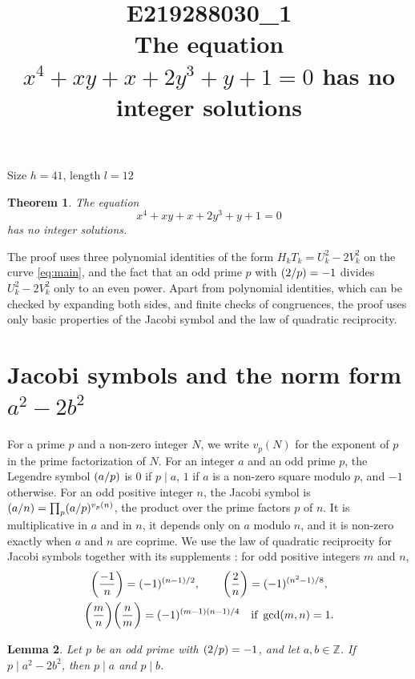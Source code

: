 \documentclass[11pt]{article}
\title{\textbf{E219288030\_1}\\[4pt] {\Large The equation $x^{4}+xy+x+2y^{3}+y+1=0$ has no integer solutions}}
\author{}
\date{}
\newtheorem{theorem}{Theorem}
\newtheorem{lemma}[theorem]{Lemma}
\newcommand{\Z}{\mathbb{Z}}
\newcommand{\leg}[2]{\mathchoice{\biggl(\dfrac{#1}{#2}\biggr)}{(#1/#2)}{(#1/#2)}{(#1/#2)}}
\begin{document}
\maketitle
\vspace{-8ex}
\begin{center}
Size $h=41$, length $l=12$
\end{center}

\begin{theorem}\label{thm:main}
The equation
\begin{equation}\label{eq:main}
x^{4}+xy+x+2y^{3}+y+1=0
\end{equation}
has no integer solutions.
\end{theorem}

The proof uses three polynomial identities of the form $H_kT_k=U_k^2-2V_k^2$ on the curve \eqref{eq:main}, and the fact that an odd prime $p$ with $\leg{2}{p}=-1$ divides $U_k^2-2V_k^2$ only to an even power. Apart from polynomial identities, which can be checked by expanding both sides, and finite checks of congruences, the proof uses only basic properties of the Jacobi symbol and the law of quadratic reciprocity.

\section{\texorpdfstring{Jacobi symbols and the norm form $a^2-2b^2$}{Jacobi symbols and the norm form}}

For a prime $p$ and a non-zero integer $N$, we write $v_p(N)$ for the exponent of $p$ in the prime factorization of $N$. For an integer $a$ and an odd prime $p$, the Legendre symbol $\leg{a}{p}$ is $0$ if $p\mid a$, $1$ if $a$ is a non-zero square modulo $p$, and $-1$ otherwise. For an odd positive integer $n$, the Jacobi symbol is $\leg{a}{n}=\prod_p\leg{a}{p}^{v_p(n)}$, the product over the prime factors $p$ of $n$. It is multiplicative in $a$ and in $n$, it depends only on $a$ modulo $n$, and it is non-zero exactly when $a$ and $n$ are coprime. We use the law of quadratic reciprocity for Jacobi symbols together with its supplements \cite[Chapter~5, \S2]{IR}: for odd positive integers $m$ and $n$,
\begin{gather*}
\leg{-1}{n}=(-1)^{(n-1)/2},\qquad\leg{2}{n}=(-1)^{(n^2-1)/8},\\
\leg{m}{n}\leg{n}{m}=(-1)^{(m-1)(n-1)/4}\quad\text{if }\gcd(m,n)=1.
\end{gather*}

\begin{lemma}\label{lem:divides}
Let $p$ be an odd prime with $\leg{2}{p}=-1$, and let $a,b\in\Z$. If $p\mid a^2-2b^2$, then $p\mid a$ and $p\mid b$.
\end{lemma}
\end{document}
